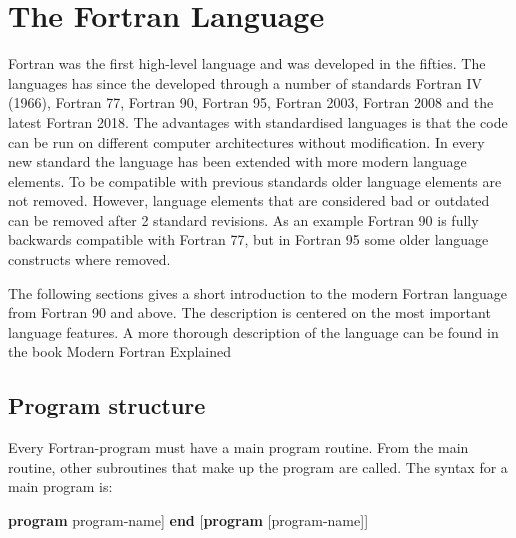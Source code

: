 \chapter{The Fortran Language}

Fortran was the first high-level language and was developed in the fifties. The languages has since the developed through a number of standards Fortran IV (1966), Fortran 77, Fortran 90, Fortran 95, Fortran 2003, Fortran 2008 and the latest Fortran 2018. The advantages with standardised languages is that the code can be run on different computer architectures without modification. In every new standard the language has been extended with more modern language elements. To be compatible with previous standards older language elements are not removed. However, language elements that are considered bad or outdated can be removed after 2 standard revisions. As an example Fortran 90 is fully backwards compatible with Fortran 77, but in Fortran 95 some
older language constructs where removed.

The following sections gives a short introduction to the modern Fortran language from Fortran 90 and above. The description is centered on the most important language features. A more thorough description of the language can be found in the book Modern Fortran Explained \cite{metcalf00}

\section{Program structure}

Every Fortran-program must have a main program routine. From the main routine, other subroutines that make up the program are called. The syntax for a main program is:

\begin{fsyntax}
\textbf{program} program-name]\newline%
[contains]\newline%
[subroutines]\newline%
\textbf{end} [\textbf{program} [program-name]]
\end{fsyntax}

